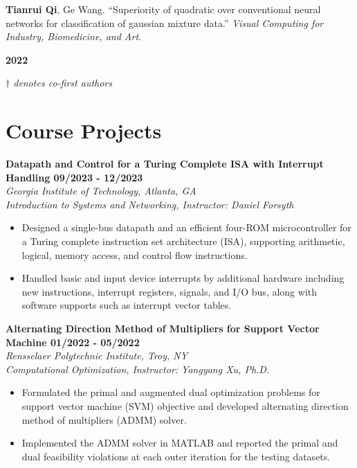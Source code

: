 \documentclass[letterpaper, 11pt]{article}
\newcommand{\subsectionvspace}{\vspace{8pt}}
\begin{document}
    \subsectionvspace

    \begin{minipage}[t]{0.9\textwidth} 
        \textbf{Tianrui Qi}, Ge Wang. 
        ``Superiority of quadratic over conventional neural networks for classification of gaussian mixture data.'' 
        \textit{Visual Computing for Industry, Biomedicine, and Art}.
    \end{minipage}%
    \begin{minipage}[t]{0.1\textwidth} \raggedleft
        \textbf{2022}
    \end{minipage}

    \subsectionvspace

    \textit{$\dag$ denotes co-first authors}


\section{Course Projects}


    \textbf{Datapath and Control for a Turing Complete ISA with Interrupt Handling \hfill 09/2023 - 12/2023} \\
    \textit{Georgia Institute of Technology, Atlanta, GA} \\
    \textit{Introduction to Systems and Networking, Instructor: Daniel Forsyth}
    \begin{itemize}
        \item Designed a single-bus datapath and an efficient four-ROM microcontroller for a Turing complete instruction set architecture (ISA), supporting arithmetic, logical, memory access, and control flow instructions.
        \item Handled basic and input device interrupts by additional hardware including new instructions, interrupt registers, signals, and I/O bus, along with software supports such as interrupt vector tables.
    \end{itemize}

    \subsectionvspace

    \textbf{Alternating Direction Method of Multipliers for Support Vector Machine \hfill 01/2022 - 05/2022} \\
    \textit{Rensselaer Polytechnic Institute, Troy, NY} \\
    \textit{Computational Optimization, Instructor: Yangyang Xu, Ph.D.}
    \begin{itemize}
        \item Formulated the primal and augmented dual optimization problems for support vector machine (SVM) objective and developed alternating direction method of multipliers (ADMM) solver.
        \item Implemented the ADMM solver in MATLAB and reported the primal and dual feasibility violations at each outer iteration for the testing datasets.
    \end{itemize}
\end{document}
